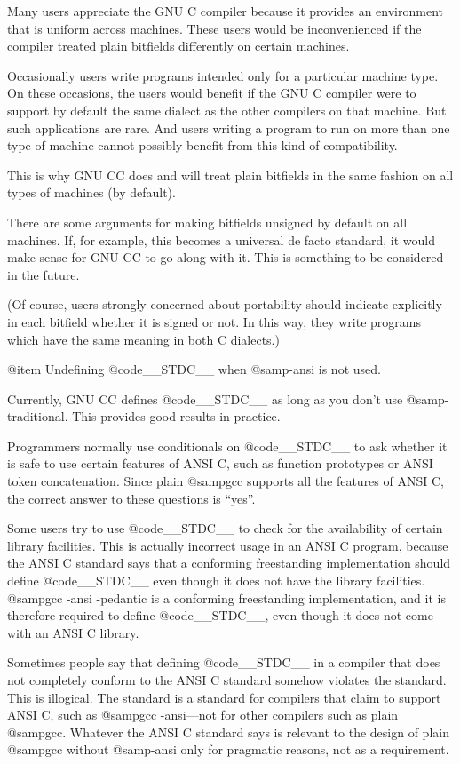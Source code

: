Many users appreciate the GNU C compiler because it provides an
environment that is uniform across machines.  These users would be
inconvenienced if the compiler treated plain bitfields differently on
certain machines.

Occasionally users write programs intended only for a particular machine
type.  On these occasions, the users would benefit if the GNU C compiler
were to support by default the same dialect as the other compilers on
that machine.  But such applications are rare.  And users writing a
program to run on more than one type of machine cannot possibly benefit
from this kind of compatibility.

This is why GNU CC does and will treat plain bitfields in the same
fashion on all types of machines (by default).

There are some arguments for making bitfields unsigned by default on all
machines.  If, for example, this becomes a universal de facto standard,
it would make sense for GNU CC to go along with it.  This is something
to be considered in the future.

(Of course, users strongly concerned about portability should indicate
explicitly in each bitfield whether it is signed or not.  In this way,
they write programs which have the same meaning in both C dialects.)

@item
Undefining @code{__STDC__} when @samp{-ansi} is not used.

Currently, GNU CC defines @code{__STDC__} as long as you don't use
@samp{-traditional}.  This provides good results in practice.

Programmers normally use conditionals on @code{__STDC__} to ask whether
it is safe to use certain features of ANSI C, such as function
prototypes or ANSI token concatenation.  Since plain @samp{gcc} supports
all the features of ANSI C, the correct answer to these questions is
``yes''.

Some users try to use @code{__STDC__} to check for the availability of
certain library facilities.  This is actually incorrect usage in an ANSI
C program, because the ANSI C standard says that a conforming
freestanding implementation should define @code{__STDC__} even though it
does not have the library facilities.  @samp{gcc -ansi -pedantic} is a
conforming freestanding implementation, and it is therefore required to
define @code{__STDC__}, even though it does not come with an ANSI C
library.

Sometimes people say that defining @code{__STDC__} in a compiler that
does not completely conform to the ANSI C standard somehow violates the
standard.  This is illogical.  The standard is a standard for compilers
that claim to support ANSI C, such as @samp{gcc -ansi}---not for other
compilers such as plain @samp{gcc}.  Whatever the ANSI C standard says
is relevant to the design of plain @samp{gcc} without @samp{-ansi} only
for pragmatic reasons, not as a requirement.

